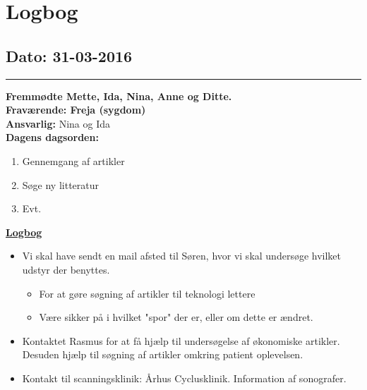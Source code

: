 \chapter{Logbog}
\section{Dato: 31-03-2016}
\hrule
\textbf{Fremmødte Mette, Ida, Nina, Anne og Ditte.} \\
\textbf{Fraværende: Freja (sygdom) } \\
\textbf{Ansvarlig:} Nina og Ida  \\
\textbf{Dagens dagsorden: }
\begin{enumerate}
	\item Gennemgang af artikler
	\item Søge ny litteratur
	\item Evt. 
\end{enumerate}

\underline{\textbf{Logbog}}
\begin{itemize}
\item Vi skal have sendt en mail afsted til Søren, hvor vi skal undersøge hvilket udstyr der benyttes.
\begin{itemize}
\item For at gøre søgning af artikler til teknologi lettere
\item Være sikker på i hvilket "spor" der er, eller om dette er ændret.
\end{itemize}
\item Kontaktet Rasmus for at få hjælp til undersøgelse af økonomiske artikler. Desuden hjælp til søgning af artikler omkring patient oplevelsen. 
\item Kontakt til scanningsklinik: Århus Cyclusklinik. Information af sonografer.
\end{itemize}
\newpage